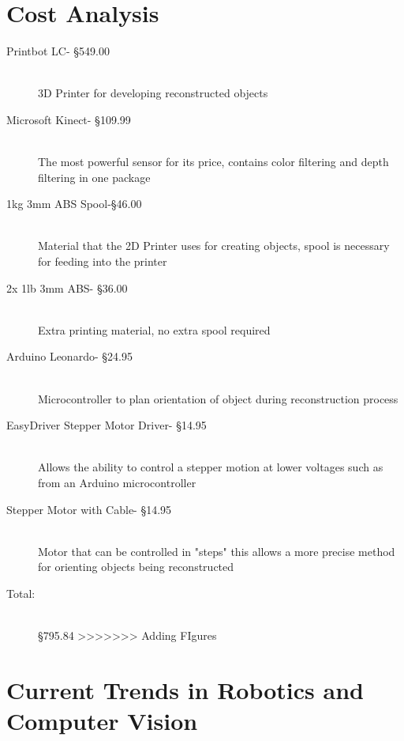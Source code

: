 \documentclass[12pt,twocolumn]{article}
\begin{document}
\begin{description}
\section{Cost Analysis}
  \begin{description}
  \item[Printbot LC- \S 549.00] \hfill \\
  3D Printer for developing reconstructed objects
  \item[Microsoft Kinect- \S 109.99] \hfill \\
  The most powerful sensor for its price, contains color filtering and depth filtering in one package
  \item[1kg 3mm ABS Spool-\S 46.00] \hfill \\
  Material that the 2D Printer uses for creating objects, spool is necessary for feeding into the printer
  \item[2x 1lb 3mm ABS- \S 36.00] \hfill \\
  Extra printing material, no extra spool required
  \item[Arduino Leonardo-  \S 24.95] \hfill \\
  Microcontroller to plan orientation of object during reconstruction process
  \item[EasyDriver Stepper Motor Driver- \S 14.95] \hfill \\
  Allows the ability to control a stepper motion at lower voltages such as from an Arduino microcontroller
  \item[Stepper Motor with Cable- \S 14.95] \hfill \\
  Motor that can be controlled in "steps" this allows a more precise method for orienting objects being reconstructed
  \item[Total:] \hfill \\
  \S 795.84
>>>>>>> Adding FIgures
  \end{description}

\section{Current Trends in Robotics and Computer Vision}


\end{description}
\end{document}
